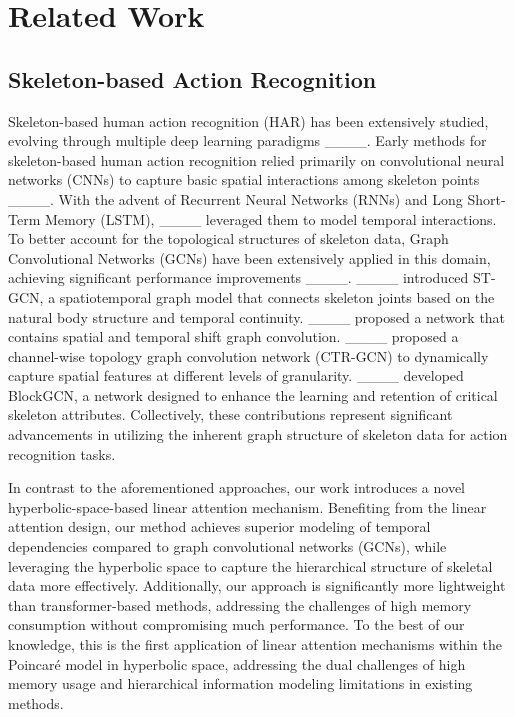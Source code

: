 \section{Related Work}
\subsection{Skeleton-based Action Recognition}
Skeleton-based human action recognition (HAR) has been extensively studied, evolving through multiple deep learning paradigms ____. Early methods for skeleton-based human action recognition relied primarily on convolutional neural networks (CNNs) to capture basic spatial interactions among skeleton points  ____. With the advent of Recurrent Neural Networks (RNNs) and Long Short-Term Memory (LSTM),  ____ leveraged them to model temporal interactions. To better account for the topological structures of skeleton data, Graph Convolutional Networks (GCNs) have been extensively applied in this domain, achieving significant performance improvements  ____.  ____ introduced ST-GCN, a spatiotemporal graph model that connects skeleton joints based on the natural body structure and temporal continuity.   ____ proposed a network that contains spatial and temporal shift graph convolution.  ____ proposed a channel-wise topology graph convolution network (CTR-GCN) to dynamically capture spatial features at different levels of granularity.  ____ developed BlockGCN, a network designed to enhance the learning and retention of critical skeleton attributes. Collectively, these contributions represent significant advancements in utilizing the inherent graph structure of skeleton data for action recognition tasks. 

In contrast to the aforementioned approaches, our work introduces a novel hyperbolic-space-based linear attention mechanism. Benefiting from the linear attention design, our method achieves superior modeling of temporal dependencies compared to graph convolutional networks (GCNs), while leveraging the hyperbolic space to capture the hierarchical structure of skeletal data more effectively. Additionally, our approach is significantly more lightweight than transformer-based methods, addressing the challenges of high memory consumption without compromising much performance. To the best of our knowledge, this is the first application of linear attention mechanisms within the Poincaré model in hyperbolic space, addressing the dual challenges of high memory usage and hierarchical information modeling limitations in existing methods. 

